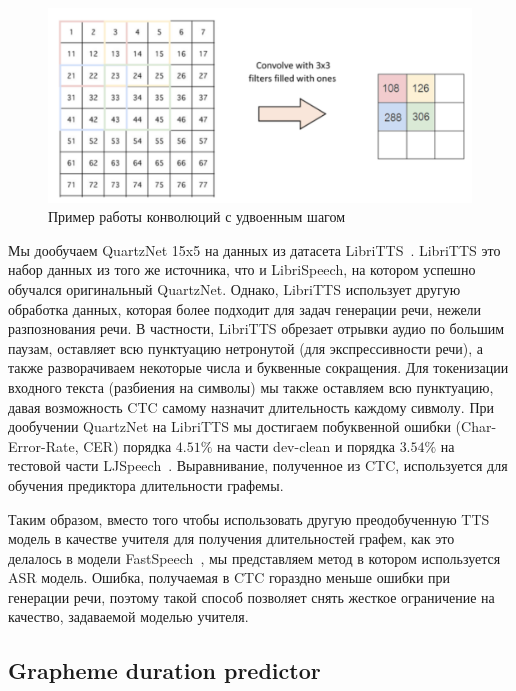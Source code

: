 \begin{figure}[!ht]
\centering
\includegraphics[width=1.0\textwidth]{images/snippets/stride-2.png}
\caption{Пример работы конволюций с удвоенным шагом}
\label{fig:stride-2}
\end{figure}

Мы дообучаем QuartzNet 15x5 на данных из датасета LibriTTS~\cite{libritts}. LibriTTS это набор данных из того же источника, что и LibriSpeech, на котором успешно обучался оригинальный QuartzNet. Однако, LibriTTS использует другую обработка данных, которая более подходит для задач генерации речи, нежели разпознования речи. В частности, LibriTTS обрезает отрывки аудио по большим паузам, оставляет всю пунктуацию нетронутой (для экспрессивности речи), а также разворачиваем некоторые числа и буквенные сокращения. Для токенизации входного текста (разбиения на символы) мы также оставляем всю пунктуацию, давая возможность CTC самому назначит длительность каждому сивмолу. При дообучении QuartzNet на LibriTTS мы достигаем побуквенной ошибки (Char-Error-Rate, CER) порядка $4.51\%$ на части dev-clean и порядка $3.54\%$ на тестовой части LJSpeech~\cite{ljspeech}. Выравнивание, полученное из CTC, используется для обучения предиктора длительности графемы.

Таким образом, вместо того чтобы использовать другую преодобученную TTS модель в качестве учителя для получения длительностей графем, как это делалось в модели FastSpeech~\cite{fastspeech}, мы представляем метод в котором используется ASR модель. Ошибка, получаемая в CTC гораздно меньше ошибки при генерации речи, поэтому такой способ позволяет снять жесткое ограничение на качество, задаваемой моделью учителя.

\subsection{Grapheme duration predictor}

